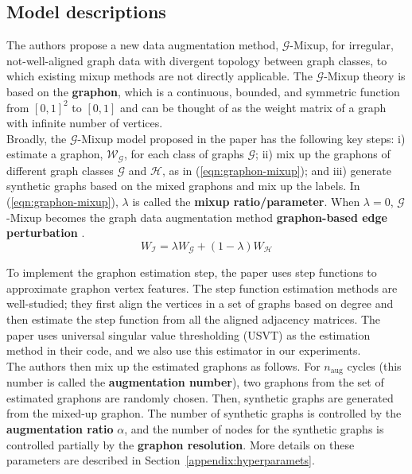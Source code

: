\subsection{Model descriptions}
The authors propose a new data augmentation method, $\mathcal{G}$-Mixup, for irregular, not-well-aligned graph data with divergent topology between graph classes, to which existing mixup methods are not directly applicable.  The $\mathcal{G}$-Mixup theory is based on the \textbf{graphon}, which is a continuous, bounded, and symmetric function from $[0,1]^{2}$ to $[0,1]$ and can be thought of as the weight matrix of a graph with infinite number of vertices.
\\

Broadly, the $\mathcal{G}$-Mixup model proposed in the paper has the following key steps: i) estimate a graphon, $\mathcal{W}_{\mathcal{G}}$, for each class of graphs $\mathcal{G}$; ii) mix up the graphons of different graph classes $\mathcal{G}$ and $\mathcal{H}$, as in (\ref{eqn:graphon-mixup}); and iii) generate synthetic graphs based on the mixed graphons and mix up the labels. 
In (\ref{eqn:graphon-mixup}), $\lambda$ is called the \textbf{mixup ratio/parameter}. When $\lambda = 0$, $\mathcal{G}$-Mixup becomes the graph data augmentation method \textbf{graphon-based edge perturbation} \cite{Hu:2021}.
\begin{equation}\label{eqn:graphon-mixup}
    W_{\mathcal{I}} = \lambda W_{\mathcal{G}} + (1-\lambda) W_{\mathcal{H}}
\end{equation}




To implement the graphon estimation step, the paper uses step functions to approximate graphon vertex features. The step function estimation methods are well-studied; they first align the vertices in a set of graphs based on degree and then estimate the step function from all the aligned adjacency matrices. The paper uses universal singular value thresholding (USVT) \cite{Chatterjee:2015} as the estimation method in their code, and we also use this estimator in our experiments. 
\\

The authors then mix up the estimated graphons as follows. For $n_{\text{aug}}$ cycles (this number is called the \textbf{augmentation number}), two graphons from the set of estimated graphons are randomly chosen. Then, synthetic graphs are generated from the mixed-up graphon. The number of synthetic graphs is controlled by the \textbf{augmentation ratio} $\alpha$, and the number of nodes for the synthetic graphs is controlled partially by the \textbf{graphon resolution}. More details on these parameters are described in Section~\ref{appendix:hyperparamets}.
\\

